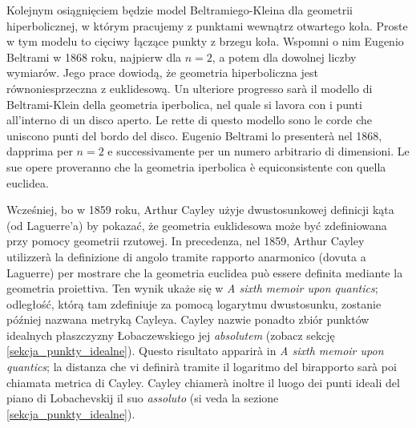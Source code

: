 Kolejnym osiągnięciem będzie model Beltramiego-Kleina dla geometrii hiperbolicznej, w którym pracujemy z punktami wewnątrz otwartego koła. %
Proste w tym modelu to cięciwy łączące punkty z brzegu koła. %
Wspomni o nim Eugenio Beltrami w 1868 roku, najpierw dla $n = 2$, a potem dla dowolnej liczby wymiarów. %
Jego prace dowiodą, że geometria hiperboliczna jest równoniesprzeczna z euklidesową. %
Un ulteriore progresso sarà il modello di Beltrami-Klein della geometria iperbolica, nel quale si lavora con i punti all'interno di un disco aperto. %
Le rette di questo modello sono le corde che uniscono punti del bordo del disco. %
Eugenio Beltrami lo presenterà nel 1868, dapprima per $n = 2$ e successivamente per un numero arbitrario di dimensioni. %
Le sue opere proveranno che la geometria iperbolica è equiconsistente con quella euclidea. %

Wcześniej, bo w 1859 roku, Arthur Cayley użyje dwustosunkowej definicji kąta (od Laguerre'a) by pokazać, że geometria euklidesowa może być zdefiniowana przy pomocy geometrii rzutowej. %
In precedenza, nel 1859, Arthur Cayley utilizzerà la definizione di angolo tramite rapporto anarmonico (dovuta a Laguerre) per mostrare che la geometria euclidea può essere definita mediante la geometria proiettiva. %
%
%
%
Ten wynik ukaże się w \emph{A sixth memoir upon quantics}; odległość, którą tam zdefiniuje za pomocą logarytmu dwustosunku, zostanie później nazwana metryką Cayleya. %
Cayley nazwie ponadto zbiór punktów idealnych płaszczyzny Łobaczewskiego jej \emph{absolutem} \cite[s. 307]{eves1_1972} (zobacz sekcję \ref{sekcja_punkty_idealne}). %
Questo risultato apparirà in \emph{A sixth memoir upon quantics}; la distanza che vi definirà tramite il logaritmo del birapporto sarà poi chiamata metrica di Cayley. %
Cayley chiamerà inoltre il luogo dei punti ideali del piano di Lobachevskij il suo \emph{assoluto} \cite[p. 307]{eves1_1972} (si veda la sezione \ref{sekcja_punkty_idealne}). %

